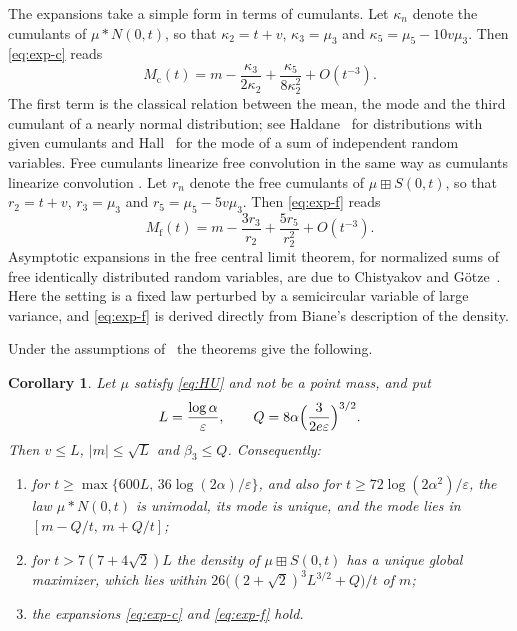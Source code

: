 \documentclass[11pt]{amsart}
\newtheorem{corollary}[theorem]{Corollary}
\theoremstyle{definition}
\newcommand{\Mcl}{M_{\mathrm{c}}}
\newcommand{\Mfr}{M_{\mathrm{f}}}
\begin{document}
The expansions take a simple form in terms of cumulants. Let $\kappa_n$ denote the cumulants of $\mu*N(0,t)$, so that
$\kappa_2=t+v$, $\kappa_3=\mu_3$ and $\kappa_5=\mu_5-10v\mu_3$. Then \eqref{eq:exp-c} reads
\begin{equation}\label{eq:cum-c}
\Mcl(t)=m-\frac{\kappa_3}{2\kappa_2}+\frac{\kappa_5}{8\kappa_2^2}+O(t^{-3}).
\end{equation}
The first term is the classical relation between the mean, the mode and the third cumulant of a nearly normal
distribution; see Haldane~\cite{Haldane} for distributions with given cumulants and Hall~\cite{Hall} for the mode
of a sum of independent random variables. Free cumulants linearize free convolution in the same way as cumulants
linearize convolution \cite[Lectures~11 and~12]{NS}. Let $r_n$ denote the free cumulants of $\mu\boxplus S(0,t)$, so
that $r_2=t+v$, $r_3=\mu_3$ and $r_5=\mu_5-5v\mu_3$. Then \eqref{eq:exp-f} reads
\begin{equation}\label{eq:cum-f}
\Mfr(t)=m-\frac{3r_3}{r_2}+\frac{5r_5}{r_2^2}+O(t^{-3}).
\end{equation}
Asymptotic expansions in the free central limit theorem, for normalized sums of free identically distributed random
variables, are due to Chistyakov and G\"otze~\cite{CG}. Here the setting is a fixed law perturbed by a semicircular
variable of large variance, and \eqref{eq:exp-f} is derived directly from Biane's description of the density.

Under the assumptions of~\cite{HU} the theorems give the following.

\begin{corollary}\label{cor:HU}
Let $\mu$ satisfy \eqref{eq:HU} and not be a point mass, and put
\[
L=\frac{\log\alpha}{\varepsilon},\qquad Q=8\alpha\Bigl(\frac{3}{2e\varepsilon}\Bigr)^{3/2}.
\]
Then $v\le L$, $|m|\le\sqrt L$ and $\beta_3\le Q$. Consequently:
\begin{enumerate}
\item[(i)] for $t\ge\max\{600L,\,36\log(2\alpha)/\varepsilon\}$, and also for $t\ge72\log(2\alpha^2)/\varepsilon$,
the law $\mu*N(0,t)$ is unimodal, its mode is unique, and the mode lies in $[m-Q/t,\,m+Q/t]$;
\item[(ii)] for $t>7(7+4\sqrt2)L$ the density of $\mu\boxplus S(0,t)$ has a unique global maximizer, which lies
within $26\bigl((2+\sqrt2)^3L^{3/2}+Q\bigr)/t$ of $m$;
\item[(iii)] the expansions \eqref{eq:exp-c} and \eqref{eq:exp-f} hold.
\end{enumerate}
\end{corollary}
\end{document}
